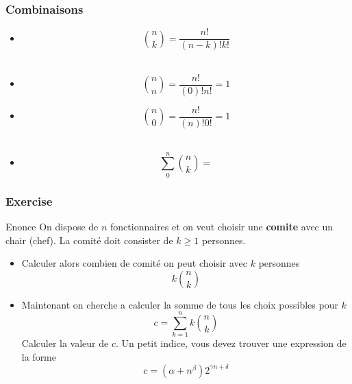 \documentclass{beamer}
\begin{document}
\begin{frame}[<+->]
  \frametitle{Combinaisons}
  
  \begin{itemize}
  \small
    \item 
    \begin{equation*}
    \binom{n}{k} = \dfrac{n!}{(n-k)!k!}
    \end{equation*}
    \\[8pt]
    \item 

    \begin{equation*}
    \binom{n}{n} = \dfrac{n!}{(0)!n!} = 1
    \end{equation*}

    \item 

    \begin{equation*}
    \binom{n}{0} = \dfrac{n!}{(n)!0!} = 1
    \end{equation*}
    \\[8pt]
    \item 
    \begin{equation*}
    \sum_0^n \binom{n}{k} = 
    \end{equation*}
  \end{itemize}
\end{frame}
\begin{frame}[t]
  \frametitle{Exercise}
 \begin{block}{Enonce}
 \scriptsize
 On dispose de $n$ fonctionnaires et on veut choisir une \textbf{comite} avec un
 chair (chef). La comité doit consister de $k\geq 1$ personnes.\\[4pt]
 \end{block} 
 \begin{itemize}
 \scriptsize
   \item<1-> Calculer alors combien de comité on peut choisir avec $k$ personnes
   \pause
   $$
   k\binom{n}{k}
   $$
   \item<3-> Maintenant on cherche a calculer la somme de tous les choix
   possibles pour $k$
   $$
   c = \sum_{k=1}^n k\binom{n}{k}
   $$
   \pause
   Calculer la valeur de $c$. Un petit indice, vous devez trouver une expression
   de la forme 
   $$
   c = (\alpha + n^\beta)2^{\gamma n  + \delta}
   $$
 \end{itemize}
\end{frame}
\end{document}
